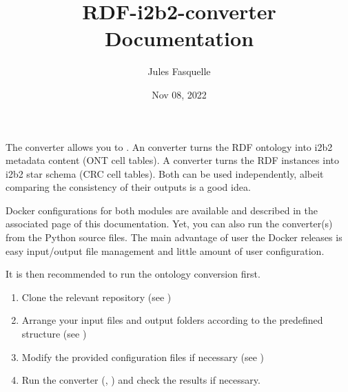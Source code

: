\documentclass[letterpaper,10pt,english]{sphinxmanual}
\title{RDF-i2b2-converter Documentation}
\date{Nov 08, 2022}
\author{Jules Fasquelle}
\begin{document}
\pagestyle{empty}
\sphinxmaketitle
\pagestyle{plain}
\sphinxtableofcontents
\pagestyle{normal}
\label{\detokenize{index::doc}}


The converter allows you to .
An  converter turns the RDF ontology into i2b2 metadata content (ONT cell tables).
A  converter turns the RDF instances into i2b2 star schema (CRC cell tables).
Both can be used independently, albeit comparing the consistency of their outputs is a good idea.

Docker configurations for both modules are available and described in the associated page of this documentation. Yet, you can also run the converter(s) from the Python source files.
The main advantage of user the Docker releases is easy input/output file management and little amount of user configuration.

 It is then recommended to run the ontology conversion first.

\begin{enumerate}
\def\theenumi{\arabic{enumi}}
\def\labelenumi{\theenumi .}
\makeatletter\def\p@enumii{\p@enumi \theenumi .}\makeatother
\item {} 
Clone the relevant repository (see {\hyperref[\detokenize{index:reqs}]{}})

\item {} 
Arrange your input files and output folders according to the predefined structure (see {\hyperref[\detokenize{structure:structure}]{}})

\item {} 
Modify the provided configuration files if necessary (see {\hyperref[\detokenize{index:index-configuration}]{}})

\item {} 
Run the converter ({\hyperref[\detokenize{run_data:run-data}]{}}, {\hyperref[\detokenize{run_ontology:run-ontology}]{}}) and check the results {\hyperref[\detokenize{verbose:verbose}]{}} if necessary.

\end{enumerate}
\end{document}
